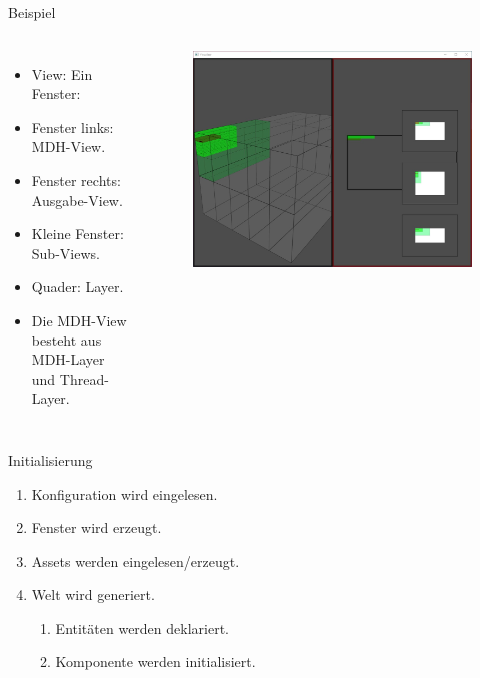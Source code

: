 \documentclass{presentation}
\begin{document}
\begin{frame}{Beispiel}
    \begin{columns}
        \begin{itemize}
            \item View: Ein Fenster:
            \item Fenster links: MDH-View.
            \item Fenster rechts: Ausgabe-View.
            \item Kleine Fenster: Sub-Views.
            \item Quader: Layer.
            \item Die MDH-View besteht aus MDH-Layer und Thread-Layer.
        \end{itemize}
        \begin{figure}
            \includegraphics[scale=0.15]{visualizer.jpg}
        \end{figure}
    \end{columns}
\end{frame}

\begin{frame}{Initialisierung}
    \begin{enumerate}
        \item Konfiguration wird eingelesen.
        \item Fenster wird erzeugt.
        \item Assets werden eingelesen/erzeugt.
        \item Welt wird generiert.
        \begin{enumerate}
            \item Entitäten werden deklariert.
            \item Komponente werden initialisiert.
        \end{enumerate}
    \end{enumerate}
\end{frame}
\end{document}
